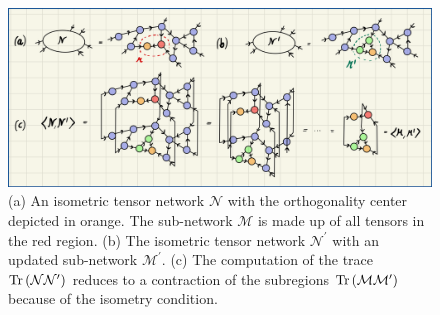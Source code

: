 \begin{figure}
	\centering
	\includegraphics[width=\textwidth]{figures/Tensor_Networks/isometric_tensor_network_local_approximation.jpeg}
	\caption{(a) An isometric tensor network $\mathcal{N}$ with the orthogonality center depicted in orange. The sub-network $\mathcal{M}$ is made up of all tensors in the red region. (b) The isometric tensor network $\mathcal{N}^\prime$ with an updated sub-network $\mathcal{M}^\prime$. (c) The computation of the trace $\operatorname{Tr}\left(\mathcal{N}\mathcal{N}^\prime\right)$ reduces to a contraction of the subregions $\operatorname{Tr}\left(\mathcal{M}\mathcal{M}^\prime\right)$ because of the isometry condition.}
	\label{fig:isometric_tensor_network_local_approximation}
\end{figure}